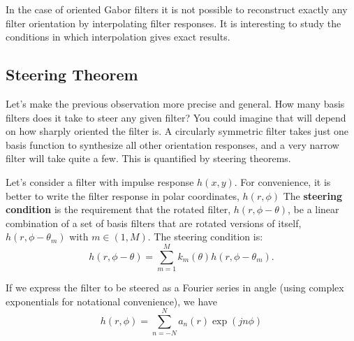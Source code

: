 
In the case of oriented Gabor filters it is not possible to reconstruct exactly any filter orientation by interpolating filter responses. It is interesting to study the conditions in which interpolation gives exact results. 

\subsection{Steering Theorem}

Let's make the previous observation more precise and general.  How many basis filters does it take to steer any given
filter?  You could imagine that will depend on how sharply oriented the filter is.  A circularly symmetric filter takes just one basis function
to synthesize all other orientation responses, and a very narrow filter will take quite a few.  This is quantified by steering
theorems.

Let's consider a filter with impulse response $h(x,y)$. For convenience, it is better to write the filter response in polar coordinates, $h(r,\phi)$
The {\bf steering condition} is the requirement that the rotated
filter, $h(r,\phi - \theta)$, be a linear combination of a set of basis filters that are rotated versions of itself, $h(r,\phi - \theta_m)$ with $m \in (1,M)$. The steering condition is:
\begin{equation}
h(r,\phi - \theta) = \sum_{m=1}^{M} k_{m}(\theta) h(r,\phi - \theta_m) .
\label{eq:steeringcondition}
\end{equation}

If we express the filter to be steered as a Fourier series in angle (using complex exponentials for notational convenience), we have
\begin{equation}
h(r,\phi) = \sum_{n=-N}^{N} a_n(r) \exp \left( j n \phi \right)
\label{eq:fourierseriesinangle}
\end{equation}

